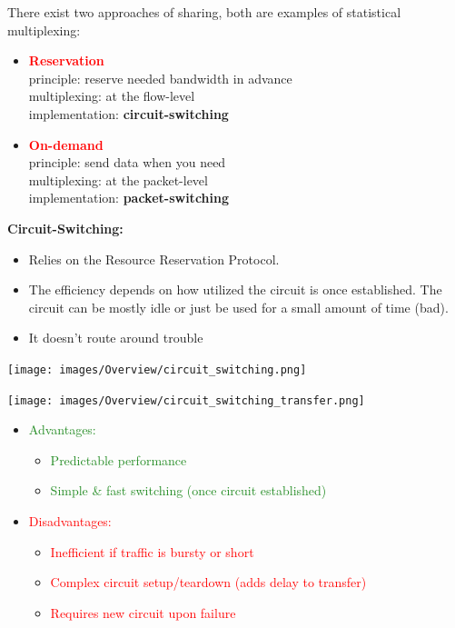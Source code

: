 \documentclass[a4paper, fontsize=8pt, landscape, DIV=1]{scrartcl}
\begin{document}
\begin{multicols*}{4}
		There exist two approaches of sharing, both are examples of statistical
		multiplexing: 
		\begin{itemize}
			\item \textcolor{red}{\textbf{Reservation}}\\
			principle: reserve needed bandwidth in advance\\
			multiplexing: at the flow-level\\
			implementation: \textbf{circuit-switching}  
			\item \textcolor{red}{\textbf{On-demand}}\\
			principle: send data when you need\\
			multiplexing: at the packet-level\\
			implementation: \textbf{packet-switching}
		\end{itemize}
		\textbf{Circuit-Switching:}
		\vspace{-0.5cm}
		\begin{itemize}[noitemsep]
			\item Relies on the Resource Reservation Protocol.
			\item The efficiency depends on how utilized the circuit is once
			established. The circuit can be mostly idle or just be used for a small amount
			of time (bad).
			\item It doesn't route around trouble 
		\end{itemize}
		\texttt{[image: images/Overview/circuit\_switching.png]}
		
		\texttt{[image: images/Overview/circuit\_switching\_transfer.png]}
		\begin{itemize}[noitemsep]
			\item \textcolor{ForestGreen}{Advantages:}
			\begin{itemize}
				\item \textcolor{ForestGreen}{Predictable performance} 
				\item \textcolor{ForestGreen}{Simple \& fast switching (once circuit
					established)}
			\end{itemize}
			\item \textcolor{red}{Disadvantages:}
			\begin{itemize}
				\item \textcolor{red}{Inefficient if traffic is bursty or short}
				\item \textcolor{red}{Complex circuit setup/teardown (adds delay to
					transfer)}
				\item \textcolor{red}{Requires new circuit upon failure}
			\end{itemize} 
		\end{itemize}
		\columnbreak
		

\end{multicols*}
\end{document}
